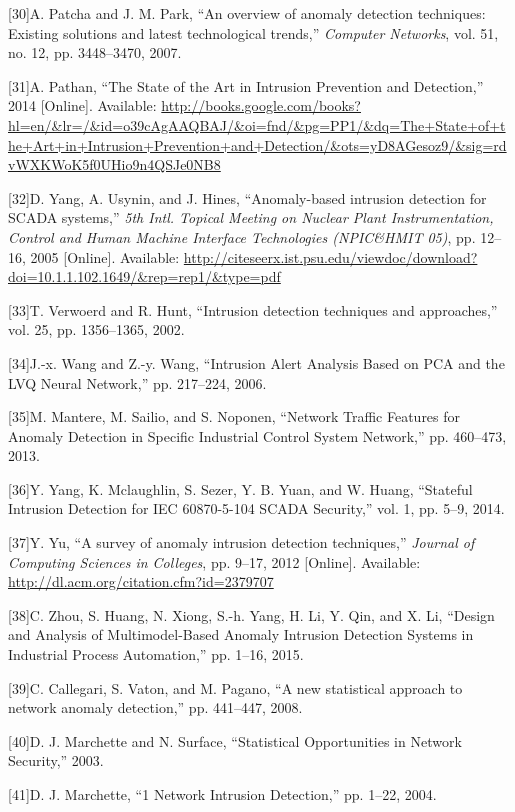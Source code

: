 \documentclass[11pt,]{article}
\begin{document}
{[}30{]}A. Patcha and J. M. Park, ``An overview of anomaly detection
techniques: Existing solutions and latest technological trends,''
\emph{Computer Networks}, vol. 51, no. 12, pp. 3448--3470, 2007.

{[}31{]}A. Pathan, ``The State of the Art in Intrusion Prevention and
Detection,'' 2014 {[}Online{]}. Available:
\url{http://books.google.com/books?hl=en/\&lr=/\&id=o39cAgAAQBAJ/\&oi=fnd/\&pg=PP1/\&dq=The+State+of+the+Art+in+Intrusion+Prevention+and+Detection/\&ots=yD8AGesoz9/\&sig=rdvWXKWoK5f0UHio9n4QSJe0NB8}

{[}32{]}D. Yang, A. Usynin, and J. Hines, ``Anomaly-based intrusion
detection for SCADA systems,'' \emph{5th Intl. Topical Meeting on
Nuclear Plant Instrumentation, Control and Human Machine Interface
Technologies (NPIC\&HMIT 05)}, pp. 12--16, 2005 {[}Online{]}. Available:
\url{http://citeseerx.ist.psu.edu/viewdoc/download?doi=10.1.1.102.1649/\&rep=rep1/\&type=pdf}

{[}33{]}T. Verwoerd and R. Hunt, ``Intrusion detection techniques and
approaches,'' vol. 25, pp. 1356--1365, 2002.

{[}34{]}J.-x. Wang and Z.-y. Wang, ``Intrusion Alert Analysis Based on
PCA and the LVQ Neural Network,'' pp. 217--224, 2006.

{[}35{]}M. Mantere, M. Sailio, and S. Noponen, ``Network Traffic
Features for Anomaly Detection in Specific Industrial Control System
Network,'' pp. 460--473, 2013.

{[}36{]}Y. Yang, K. Mclaughlin, S. Sezer, Y. B. Yuan, and W. Huang,
``Stateful Intrusion Detection for IEC 60870-5-104 SCADA Security,''
vol. 1, pp. 5--9, 2014.

{[}37{]}Y. Yu, ``A survey of anomaly intrusion detection techniques,''
\emph{Journal of Computing Sciences in Colleges}, pp. 9--17, 2012
{[}Online{]}. Available: \url{http://dl.acm.org/citation.cfm?id=2379707}

{[}38{]}C. Zhou, S. Huang, N. Xiong, S.-h. Yang, H. Li, Y. Qin, and X.
Li, ``Design and Analysis of Multimodel-Based Anomaly Intrusion
Detection Systems in Industrial Process Automation,'' pp. 1--16, 2015.

{[}39{]}C. Callegari, S. Vaton, and M. Pagano, ``A new statistical
approach to network anomaly detection,'' pp. 441--447, 2008.

{[}40{]}D. J. Marchette and N. Surface, ``Statistical Opportunities in
Network Security,'' 2003.

{[}41{]}D. J. Marchette, ``1 Network Intrusion Detection,'' pp. 1--22,
2004.
\end{document}

